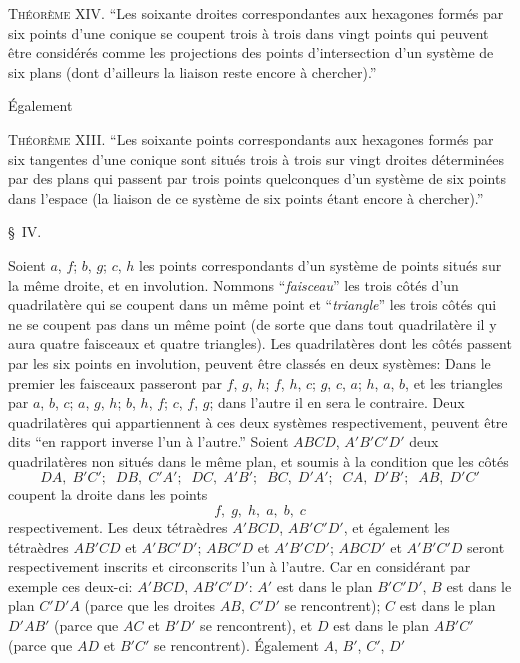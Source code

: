 \documentclass[11pt]{article}
\begin{document}
\medskip
\noindent\textsc{Th\'eor\`eme XIV.} ``Les soixante droites correspondantes aux hexagones form\'es par
six points d'une conique se coupent trois \`a trois dans vingt points qui peuvent \^etre
consid\'er\'es comme les projections des points d'intersection d'un syst\`eme de six plans
(dont d'ailleurs la liaison reste encore \`a chercher).''

\medskip
\noindent\'Egalement

\medskip
\noindent\textsc{Th\'eor\`eme XIII.} ``Les soixante points correspondants aux hexagones form\'es par six
tangentes d'une conique sont situ\'es trois \`a trois sur vingt droites d\'etermin\'ees par des
plans qui passent par trois points quelconques d'un syst\`eme de six points dans l'espace
(la liaison de ce syst\`eme de six points \'etant encore \`a chercher).''

\bigskip
\begin{center}\S\ IV.\end{center}

\smallskip
Soient $a$, $f$; $b$, $g$; $c$, $h$ les points correspondants d'un syst\`eme de points situ\'es sur
la m\^eme droite, et en involution. Nommons ``\emph{faisceau}'' les trois c\^ot\'es d'un quadrilat\`ere
qui se coupent dans un m\^eme point et ``\emph{triangle}'' les trois c\^ot\'es qui ne se coupent pas
dans un m\^eme point (de sorte que dans tout quadrilat\`ere il y aura quatre faisceaux et
quatre triangles). Les quadrilat\`eres dont les c\^ot\'es passent par les six points en involu\-tion,
peuvent \^etre class\'es en deux syst\`emes: Dans le premier les faisceaux passeront par
$f$, $g$, $h$; $f$, $h$, $c$; $g$, $c$, $a$; $h$, $a$, $b$, et les triangles par $a$, $b$, $c$; $a$, $g$, $h$; $b$, $h$, $f$; $c$, $f$, $g$;
dans l'autre il en sera le contraire. Deux quadrilat\`eres qui appartiennent \`a ces deux
syst\`emes respectivement, peuvent \^etre dits ``en rapport inverse l'un \`a l'autre.'' Soient
$ABCD$, $A'B'C'D'$ deux quadrilat\`eres non situ\'es dans le m\^eme plan, et soumis \`a la condi\-tion
que les c\^ot\'es
\[
DA,\;B'C';\;\; DB,\;C'A';\;\; DC,\;A'B';\;\; BC,\;D'A';\;\; CA,\;D'B';\;\; AB,\;D'C'
\]
coupent la droite dans les points
\[
f,\;g,\;h,\;a,\;b,\;c
\]
respectivement. Les deux t\'etra\`edres $A'BCD$, $AB'C'D'$, et \'egalement les t\'etra\`edres $AB'CD$
et $A'BC'D'$; $ABC'D$ et $A'B'CD'$; $ABCD'$ et $A'B'C'D$ seront respectivement inscrits et
circonscrits l'un \`a l'autre. Car en consid\'erant par exemple ces deux-ci: $A'BCD$, $AB'C'D'$:
$A'$ est dans le plan $B'C'D'$, $B$ est dans le plan $C'D'A$ (parce que les droites $AB$, $C'D'$
se rencontrent); $C$ est dans le plan $D'AB'$ (parce que $AC$ et $B'D'$ se rencontrent), et $D$
est dans le plan $AB'C'$ (parce que $AD$ et $B'C'$ se rencontrent). \'Egalement $A$, $B'$, $C'$, $D'$
\end{document}
